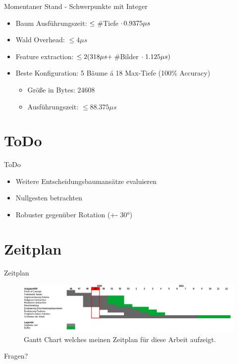 \documentclass[10pt]{beamer}
\begin{document}
\begin{frame}{Momentaner Stand - Schwerpunkte mit Integer}
\begin{itemize}
    \item Baum Ausführungszeit: $\leq \hspace{0.1cm}$\#Tiefe$\hspace{0.1cm}\cdot \hspace{0.05cm} 0.9375 \mu s$
    \item Wald Overhead: $\leq 4\mu s$
    \item Feature extraction: $\leq 2(318\mu s + \hspace{0.05cm} $\#Bilder $ \cdot \hspace{0.1cm} 1.125 \mu s)$
    \item Beste Konfiguration: 5 Bäume á 18 Max-Tiefe (100\% Accuracy)
    \begin{itemize}
        \item Größe in Bytes: 24608
        \item Ausführungszeit: $\leq 88.375 \mu s$
    \end{itemize}
\end{itemize}
\end{frame}

\section{ToDo}
\begin{frame}{ToDo}
\begin{itemize}
    \item Weitere Entscheidungsbaumansätze evaluieren
    \item Nullgesten betrachten
    \item Robuster gegenüber Rotation (+- 30°)
\end{itemize}
\end{frame}

\section{Zeitplan}
\begin{frame}{Zeitplan}
\begin{figure}
    \centering
    \includegraphics[width=\linewidth]{gantt_chart.png}
    \caption{Gantt Chart welches meinen Zeitplan für diese Arbeit aufzeigt.}
\end{figure}
\end{frame}
\begin{frame}[standout]
  Fragen?
\end{frame}
\end{document}
